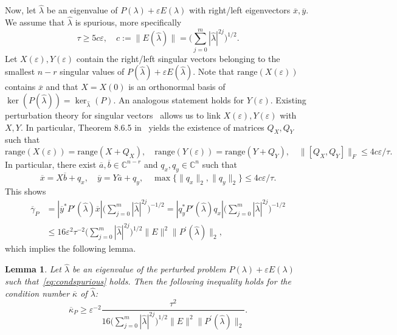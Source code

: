 \documentclass[12pt]{article}
\newtheorem{lemma}[theorem]{Lemma}
\begin{document}
Now, let $\hat{\lambda}$ be an eigenvalue of $P(\lambda)+\varepsilon E(\lambda)$ with right/left eigenvectors $\overline{x}, \overline{y}$. 
We assume that $\hat \lambda$ is spurious, more specifically \begin{equation} \label{eq:condspurious}
\tau \ge 5 c\varepsilon, \quad c := \|E(\hat \lambda)\| = \Big( \sum^m_{j=0}|\hat \lambda|^{2j} \Big)^{1/2}.
\end{equation}
Let $X(\varepsilon), Y(\varepsilon)$ contain the right/left singular vectors belonging to the smallest $n-r$ singular values of $P(\hat{\lambda})+\varepsilon E(\hat{\lambda})$. Note that $\mathrm{range}(X(\varepsilon))$ contains $\overline{x}$ and that $X = X(0)$ is an orthonormal basis of $\ker(P(\hat \lambda)) = \ker_{\hat \lambda}(P)$. An analogous statement holds for $Y(\varepsilon)$. Existing perturbation theory for singular vectors~\cite{Stewart1973,wedin1927perturbation} allows us to link $X(\varepsilon),Y(\varepsilon)$ with $X,Y$. In particular, Theorem 8.6.5 in~\cite{Golub2013} yields the existence of matrices $Q_X,Q_Y$ such that
\[
 \mathrm{range}(X(\varepsilon)) = \mathrm{range}(X+Q_X),\quad 
 \mathrm{range}(Y(\varepsilon)) = \mathrm{range}(Y+Q_Y),\quad 
 \|[Q_X,Q_Y]\|_F \le 4 c\varepsilon / \tau.
\]
In particular, there exist $\overline{a},\overline{b}\in \mathbb{C}^{n-r}$ and $q_x,q_y\in \mathbb{C}^n$ such that
\[
    \overline{x} = X\overline{b} + q_x, \quad \overline{y} = Y\overline{a} + q_y,\quad  \max\{\|q_x\|_2,\|q_y\|_2\}\leq 4 c \varepsilon / \tau.
\]
This shows
\begin{align*}
    \overline{\gamma}_P &= |\overline{y}^*P'(\hat{\lambda})\overline{x}|\Big( \sum^m_{j=0} |\hat{\lambda}|^{2j} \Big)^{-1/2} = |q_y^*P'(\hat{\lambda})q_x|\Big( \sum^m_{j=0} |\hat{\lambda}|^{2j} \Big)^{-1/2} \\\
    &\le 
    16 \varepsilon^2 \tau^{-2} \Big( \sum\limits^m_{j=0}|\hat \lambda|^{2j} \Big)^{1/2} \|E\|^2 \|P^\prime(\hat{\lambda})\|_2
    ,
\end{align*}
which implies the following lemma.
\begin{lemma}\label{l:PgammaSpourious}
Let $\hat{\lambda}$ be an eigenvalue of the perturbed problem $P(\lambda)+\varepsilon E(\lambda)$ such that~\eqref{eq:condspurious} holds. Then the following inequality holds for the condition number $\overline{\kappa}$ of $\hat \lambda$:
\[
    \overline{\kappa}_P \geq \varepsilon^{-2} \frac{\tau^2}{16 \Big( \sum\limits^m_{j=0}|\hat \lambda|^{2j} \Big)^{1/2} \|E\|^2 \|P^\prime(\hat{\lambda})\|_2}.
\]
\end{lemma}
\end{document}
